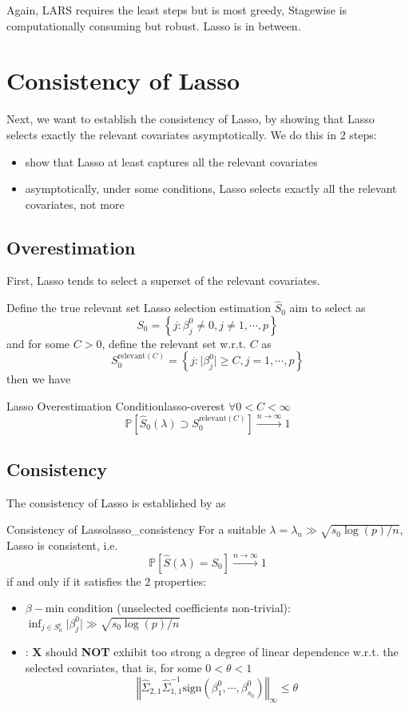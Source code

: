 \documentclass[twoside]{article}
\begin{document}
Again, LARS requires the least steps but is most greedy, Stagewise is computationally consuming but robust. Lasso is in between.

\section{Consistency of Lasso}
Next, we want to establish the consistency of Lasso, by showing that Lasso selects exactly the relevant covariates asymptotically. We do this in 2 steps:
\begin{itemize}
    \item show that Lasso at least captures all the relevant covariates
    \item asymptotically, under some conditions, Lasso selects exactly all the relevant covariates, not more
\end{itemize}

\subsection{Overestimation}
First, Lasso tends to select a superset of the relevant covariates.

Define the true relevant set Lasso selection estimation $\hat{S}_0$ aim to select as
    $$ S_0 = \left\{ j:\beta^0_j \neq 0,j \neq 1,\cdots,p \right\} $$
    and for some $C>0$, define the relevant set w.r.t. $C$ as $$ S_0^{\text{relevant}(C)} = \left\{ j: \lvert \beta^0_j \rvert \geq C, j=1,\cdots,p \right\} $$ then we have
\begin{theorem}{Lasso Overestimation Condition}{lasso-overest}
    $\forall 0<C<\infty$ $$ \mathbb{P}\left[ \hat{S}_0(\lambda) \supset S_0^{\text{relevant}(C)} \right] \xrightarrow{n\rightarrow \infty}1 $$
\end{theorem}

\subsection*{Consistency}
The consistency of Lasso is established by \citet{meinshausen2006variable} as
\begin{theorem}{Consistency of Lasso}{lasso_consistency}
    For a suitable $\lambda = \lambda_n \gg \sqrt{s_0\log(p)/n}$, Lasso is consistent, i.e. $$ \mathbb{P}\left[ \hat{S}(\lambda)=S_0 \right] \xrightarrow{n\rightarrow\infty}1 $$
    if and only if it satisfies the 2 properties:
    \begin{itemize}
        \item $\beta-$min condition (unselected coefficients non-trivial): $\inf_{j\in S^c_0}\lvert \beta^0_j \rvert \gg \sqrt{s_0 \log(p)/n}$
        \item {}: $\mathbf{X}$ should \textbf{NOT} exhibit too strong a degree of linear dependence w.r.t. the selected covariates, that is, for some $0<\theta<1$ $$ \left\Vert \hat{\Sigma}_{2,1}\hat{\Sigma}_{1,1}^{-1}\mathrm{sign}\left( \beta^0_1,\cdots,\beta^0_{s_0}\right) \right\Vert _{\infty} \leq\theta $$
    \end{itemize}
\end{theorem}
\end{document}
